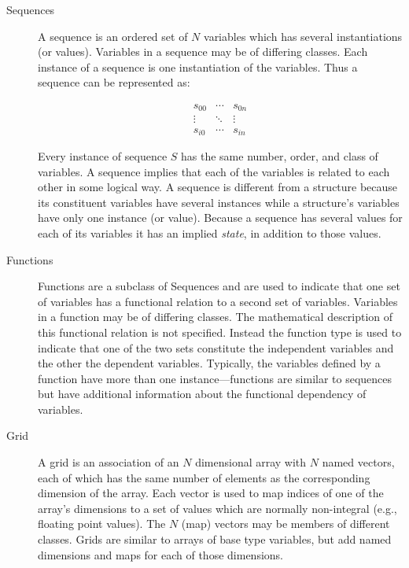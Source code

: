 \begin{description}
\item [Sequences] A sequence is an ordered set of $N$ variables which
  has several instantiations (or values). Variables in a sequence may
  be of differing classes.  Each instance of a sequence is one
  instantiation of the variables. Thus a sequence can be represented
  as:

\begin{displaymath}
\begin{array}{ccc}
  s_{0 0} & \cdots & s_{0 n} \\
  \vdots & \ddots & \vdots \\
  s_{i 0} & \cdots & s_{i n}
\end{array}
\end{displaymath}

\noindent Every instance of sequence $S$ has the same number, order,
and class of variables. A sequence implies that each of the variables
is related to each other in some logical way. A sequence is different
from a structure because its constituent variables have several
instances while a structure's variables have only one instance (or
value). Because a sequence has several values for each of its
variables it has an implied {\em state}, in addition to those values.

\item [Functions] Functions are a subclass of Sequences and are used to
  indicate that one set of variables has a functional relation to a second
  set of variables. Variables in a function may be of differing classes. The
  mathematical description of this functional relation is not
  specified. Instead the function type is used to indicate that one of the
  two sets constitute the independent variables and the other the dependent
  variables.  Typically, the variables defined by a function have more than
  one instance---functions are similar to sequences but have additional
  information about the functional dependency of variables.

\item [Grid] A grid is an association of an $N$ dimensional array with $N$
  named vectors, each of which has the same number of elements as the
  corresponding dimension of the array. Each vector is used to map indices of
  one of the array's dimensions to a set of values which are normally
  non-integral (e.g., floating point values). The $N$ (map) vectors may be
  members of different classes. Grids are similar to arrays of base type
  variables, but add named dimensions and maps for each of those dimensions.
  \label{page:grids} 

\end{description}

